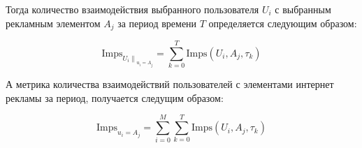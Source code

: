 \documentclass[a4paper, 14pt]{extreport}
\begin{document}
    Тогда количество взаимодействия выбранного пользователя $U_i$ с выбранным рекламным элементом $A_j$ за период
    времени $T$ определяется следующим образом:

    \begin{equation}
        \text{Imps}_{\left.U_i\right\|_{u_i = A_j}} = \sum_{k = 0}^T \text{Imps}\left( U_i, A_j, \tau_k \right)
    \end{equation}

    А метрика количества взаимодействий пользователей с элементами интернет рекламы за период,
    получается следущим образом:

    \begin{equation}
        \text{Imps}_{u_i = A_j} = \sum_{i=0}^M \sum_{k = 0}^T \text{Imps}\left( U_i, A_j, \tau_k \right)
    \end{equation}
\end{document}
